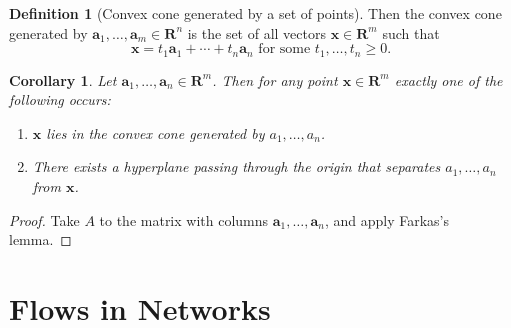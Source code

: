 \documentclass{amsbook}
\newcommand{\xx}{\mathbf x}
\renewcommand{\aa}{\mathbf a}
\newcommand{\RR}{\mathbf R}
\newtheorem{corollary}[theorem]{Corollary}
\theoremstyle{definition}
\newtheorem{definition}[theorem]{Definition}
\theoremstyle{remark}
\begin{document}
\begin{definition}
  [Convex cone generated by a set of points]
  Then the convex cone generated by $\aa_1,\dotsc,\aa_m\in \RR^n$ is the set of all vectors $\xx\in \RR^m$ such that
  \begin{displaymath}
    \xx = t_1\aa_1+\dotsb+t_n\aa_n \text{ for some }t_1,\dotsc,t_n\geq 0.
  \end{displaymath}
\end{definition}
\begin{corollary}
  Let $\aa_1,\dotsc,\aa_n\in \RR^m$.
  Then for any point $\xx\in \RR^m$ exactly one of the following occurs:
  \begin{enumerate}
  \item \label{item:3}
    $\xx$ lies in the convex cone generated by $a_1,\dotsc,a_n$.
  \item \label{item:4}
    There exists a hyperplane passing through the origin that separates $a_1,\dotsc,a_n$ from $\xx$.
  \end{enumerate}
\end{corollary}
\begin{proof}
  Take $A$ to the matrix with columns $\aa_1,\dotsc,\aa_n$, and apply Farkas's lemma.
\end{proof}
\chapter{Flows in Networks}
\label{cha:flows-networks}
\end{document}
